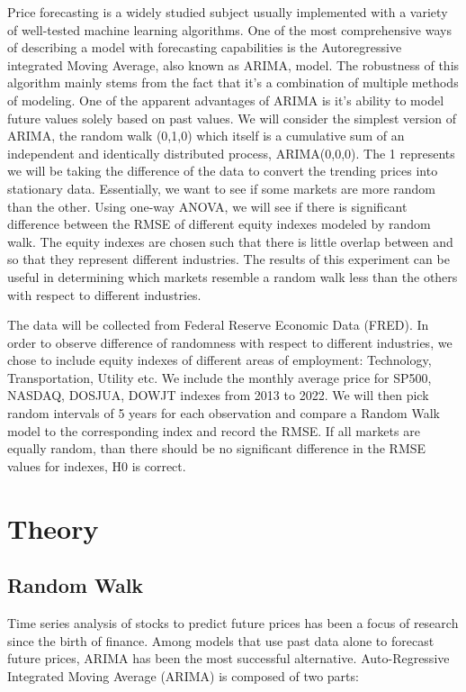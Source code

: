 \documentclass{article}[12pt]
\begin{document}
        Price forecasting is a widely studied subject usually implemented with a variety of well-tested machine learning algorithms. One of the most comprehensive ways of describing a model with forecasting capabilities is the Autoregressive integrated Moving Average, also known as ARIMA, model. The robustness of this algorithm mainly stems from the fact that it's a combination of multiple methods of modeling. One of the apparent advantages of ARIMA is it's ability to model future values solely based on past values. We will consider the simplest version of ARIMA, the random walk (0,1,0) which itself is a cumulative sum of an independent and identically distributed process, ARIMA(0,0,0). The 1 represents we will be taking the difference of the data to convert the trending prices into stationary data.        Essentially, we want to see if some markets are more random than the other. Using one-way ANOVA, we will see if there is significant difference between the RMSE of different equity indexes modeled by random walk. The equity indexes are chosen such that there is little overlap between and so that they represent different industries. The results of this experiment can be useful in determining which markets resemble a random walk less than the others with respect to different industries. 

        The data will be collected from Federal Reserve Economic Data (FRED). In order to observe difference of randomness with respect to different industries, we chose to include equity indexes of different areas of employment: Technology, Transportation, Utility etc. We include the monthly average price for SP500, NASDAQ, DOSJUA, DOWJT indexes from 2013 to 2022. We will then pick random intervals of 5 years for each observation and compare a Random Walk model to the corresponding index and record the RMSE. If all markets are equally random, than there should be no significant difference in the RMSE values for indexes, H0 is correct.
        
        \section{Theory}
        \subsection{Random Walk}
        Time series analysis of stocks to predict future prices has been a focus of research since the birth of finance. Among models that use past data alone to forecast future prices, ARIMA has been the most successful alternative. Auto-Regressive Integrated Moving Average (ARIMA) is composed of two parts:
\end{document}
